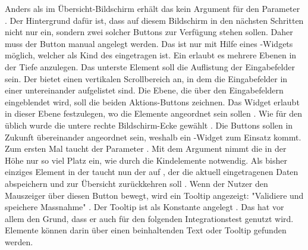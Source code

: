 Anders als im Übersicht-Bildschirm erhält das  kein Argument für den Parameter .
Der Hintergrund dafür ist, dass auf diesem Bildschirm in den nächsten Schritten nicht nur ein, sondern zwei solcher Buttons zur Verfügung stehen sollen.
 Daher muss der Button manual angelegt werden.
Das ist nur mit Hilfe eines -Widgets möglich, welcher als Kind des  eingetragen ist.
Ein  erlaubt es mehrere Ebenen in der Tiefe anzulegen.
Das unterste Element soll die Auflistung der Eingabefelder sein.
Der   bietet einen vertikalen Scrollbereich an, in dem die Eingabefelder in einer   untereinander aufgelistet sind.
Die Ebene, die  über den Eingabefeldern eingeblendet wird, soll die beiden Aktions-Buttons zeichnen.
Das Widget  erlaubt in dieser Ebene festzulegen, wo die Elemente angeordnet sein sollen .
Wie für den  üblich wurde die untere rechte Bildschirm-Ecke gewählt .
Die Buttons sollen in Zukunft übereinander angeordnet sein, weshalb ein -Widget zum Einsatz kommt.
Zum ersten Mal taucht der Parameter .
Mit dem Argument  nimmt die  in der Höhe nur so viel Platz ein, wie durch die Kindelemente notwendig. Als bisher einziges Element in der   taucht nun der  auf , der die aktuell eingetragenen Daten abspeichern  und zur Übersicht zurückkehren soll . Wenn der Nutzer den Mauszeiger über diesen Button bewegt, wird ein Tooltip angezeigt: "Validiere und speichere Massnahme" . Der Tooltip ist als Konstante angelegt . Das hat vor allem den Grund, dass er auch für den folgenden Integrationstest genutzt wird. Elemente können darin über einen beinhaltenden Text oder Tooltip gefunden werden.



